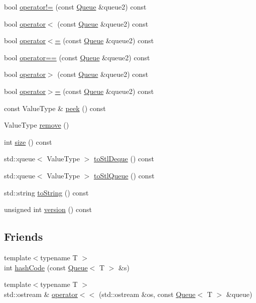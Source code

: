 \begin{DoxyCompactItemize}
\item 
bool \mbox{\hyperlink{classQueue_a385dafd253f98c0a2cec02b5c077cc2e}{operator!=}} (const \mbox{\hyperlink{classQueue}{Queue}} \&queue2) const
\item 
bool \mbox{\hyperlink{classQueue_ad2043e6acdbba5a438b040a2ceda3db7}{operator$<$}} (const \mbox{\hyperlink{classQueue}{Queue}} \&queue2) const
\item 
bool \mbox{\hyperlink{classQueue_aea83f9b16703e7b7a1e46e0746f608c0}{operator$<$=}} (const \mbox{\hyperlink{classQueue}{Queue}} \&queue2) const
\item 
bool \mbox{\hyperlink{classQueue_a85514d93aa9c51e072e2f16ed37ee889}{operator==}} (const \mbox{\hyperlink{classQueue}{Queue}} \&queue2) const
\item 
bool \mbox{\hyperlink{classQueue_afb42a4f29f0857da53e102eb8f77eea6}{operator$>$}} (const \mbox{\hyperlink{classQueue}{Queue}} \&queue2) const
\item 
bool \mbox{\hyperlink{classQueue_ad18096c65e1e4666a4103b559d2c2acd}{operator$>$=}} (const \mbox{\hyperlink{classQueue}{Queue}} \&queue2) const
\item 
const Value\+Type \& \mbox{\hyperlink{classQueue_a74501ededf728c31068dd28a70a8a1f2}{peek}} () const
\item 
Value\+Type \mbox{\hyperlink{classQueue_a025ec97fa5b04552f5ad0902c1f02ac1}{remove}} ()
\item 
int \mbox{\hyperlink{classQueue_af9593d4a5ff4274efaf429cb4f9e57cc}{size}} () const
\item 
std\+::queue$<$ Value\+Type $>$ \mbox{\hyperlink{classQueue_ac7bd339ad0d8fdd48a18540a5046e7de}{to\+Stl\+Deque}} () const
\item 
std\+::queue$<$ Value\+Type $>$ \mbox{\hyperlink{classQueue_a81f999520c8e0cc10ab34041ad56fad2}{to\+Stl\+Queue}} () const
\item 
std\+::string \mbox{\hyperlink{classQueue_a1fe5121d6528fdea3f243321b3fa3a49}{to\+String}} () const
\item 
unsigned int \mbox{\hyperlink{classQueue_a0aa696ccb72cbf928535d6b646bac1aa}{version}} () const
\end{DoxyCompactItemize}
\subsection*{Friends}
\begin{DoxyCompactItemize}
\item 
{\footnotesize template$<$typename T $>$ }\\int \mbox{\hyperlink{classQueue_aacd62c6f29c1e575d1290a1088dd29e1}{hash\+Code}} (const \mbox{\hyperlink{classQueue}{Queue}}$<$ T $>$ \&s)
\item 
{\footnotesize template$<$typename T $>$ }\\std\+::ostream \& \mbox{\hyperlink{classQueue_aaa89558f231cdb840804e46fc467902e}{operator$<$$<$}} (std\+::ostream \&os, const \mbox{\hyperlink{classQueue}{Queue}}$<$ T $>$ \&queue)
\end{DoxyCompactItemize}


